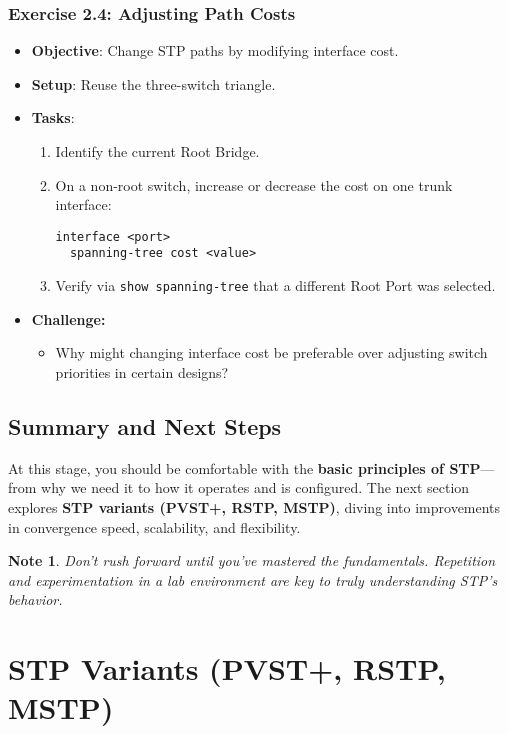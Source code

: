 \documentclass[a4paper]{report}
\newtheorem*{noteenv}{Note}
\begin{document}
\subsection*{Exercise 2.4: Adjusting Path Costs}
\begin{itemize}
  \item \textbf{Objective}: Change STP paths by modifying interface cost.
  \item \textbf{Setup}: Reuse the three-switch triangle.
  \item \textbf{Tasks}:
  \begin{enumerate}
    \item Identify the current Root Bridge.
    \item On a non-root switch, increase or decrease the cost on one trunk interface:
\begin{lstlisting}
interface <port>
  spanning-tree cost <value>
\end{lstlisting}
    \item Verify via \texttt{show spanning-tree} that a different Root Port was selected.
  \end{enumerate}

\item \textbf{Challenge:}
\begin{itemize}
  \item Why might changing interface cost be preferable over adjusting switch priorities in certain designs?
\end{itemize}
\end{itemize}
\section*{Summary and Next Steps}
At this stage, you should be comfortable with the \textbf{basic principles of STP}—from why we need it to how it operates and is configured. The next section explores \textbf{STP variants (PVST+, RSTP, MSTP)}, diving into improvements in convergence speed, scalability, and flexibility.

\begin{noteenv}
     Don’t rush forward until you’ve mastered the fundamentals. Repetition and experimentation in a lab environment are key to truly understanding STP’s behavior.
\end{noteenv}



\chapter{STP Variants (PVST+, RSTP, MSTP)}
\end{document}
